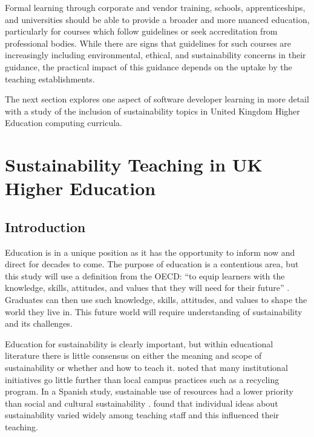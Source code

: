 Formal learning through corporate and vendor training, schools, apprenticeships, and universities should be able to provide a broader and more nuanced education, particularly for courses which follow guidelines or seek accreditation from professional bodies. While there are signs that guidelines for such courses are increasingly including environmental, ethical, and sustainability concerns in their guidance, the practical impact of this guidance depends on the uptake by the teaching establishments.

The next section explores one aspect of software developer learning in more detail with a study of the inclusion of sustainability topics in United Kingdom Higher Education computing curricula.

\section*{Sustainability Teaching in UK Higher Education}
\label{section:document study}

\subsection*{Introduction}

Education is in a unique position as it has the opportunity to inform now and direct for decades to come. The purpose of education is a contentious area, but this study will use a definition from the OECD: \enquote{to equip learners with the knowledge, skills, attitudes, and values that they will need for their future} \citep{Schleicher2018}. Graduates can then use such knowledge, skills, attitudes, and values to shape the world they live in. This future world will require understanding of sustainability and its challenges.  

Education for sustainability is clearly important, but within educational  literature there is little consensus on either the meaning and scope of sustainability or whether and how to teach it. \citet{Abernethy2014} noted that many institutional initiatives go little further than local campus practices such as a recycling program. In a Spanish study, sustainable use of resources had a lower priority than social and cultural sustainability \citep{Sanchez-Carracedo2021}. \citet{Shephard2013} found that individual ideas about sustainability varied widely among teaching staff and this influenced their teaching.

